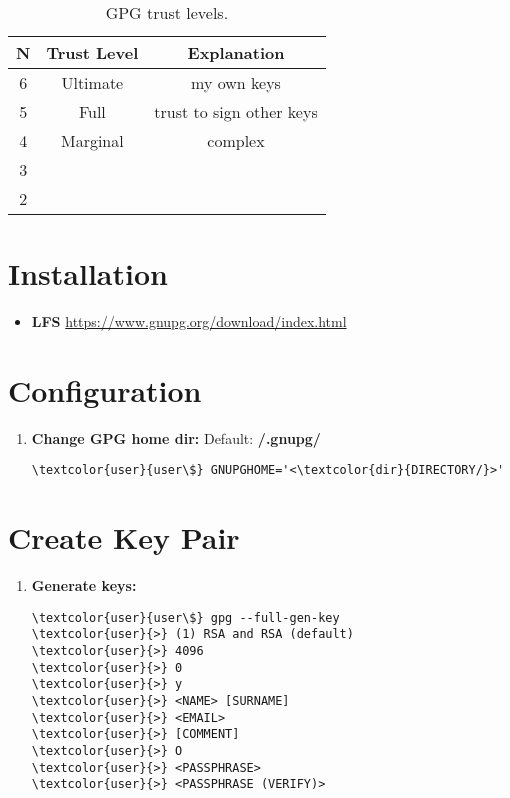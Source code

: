 \documentclass[10pt, a4paper, onecolumn, oneside, titlepage, openany]{book}
\begin{document}
\begin{table}[!ht]
\centering
\begin{tabular}{|c|c|c|}
    \hline
    \textbf{N} & \textbf{Trust Level} & \textbf{Explanation} \\
    \hline
    6 & Ultimate & my own keys\\
    5 & Full & trust to sign other keys\\
    4 & Marginal & complex\\
    3 & & \\
    2 & & \\
    \hline
\end{tabular}
\caption{GPG trust levels.}
\label{table:gpg_trust_levels}
\end{table}

\section{Installation}
\begin{itemize}
    \item \textbf{LFS}
\newline \url{https://www.gnupg.org/download/index.html}
\end{itemize}

\section{Configuration}
\begin{enumerate}
    \item \textbf{Change GPG home dir:}
\newline Default: \textbf{\textcolor{dir}{\texttildelow/.gnupg/}}
\begin{Verbatim}[commandchars=\\\{\}]
\textcolor{user}{user\$} GNUPGHOME='<\textcolor{dir}{DIRECTORY/}>'
\end{Verbatim}
\end{enumerate}

\section{Create Key Pair}
\begin{enumerate}
    \item \textbf{Generate keys:}
\begin{Verbatim}[commandchars=\\\{\}]
\textcolor{user}{user\$} gpg --full-gen-key
\textcolor{user}{>} (1) RSA and RSA (default)
\textcolor{user}{>} 4096
\textcolor{user}{>} 0
\textcolor{user}{>} y
\textcolor{user}{>} <NAME> [SURNAME]
\textcolor{user}{>} <EMAIL>
\textcolor{user}{>} [COMMENT]
\textcolor{user}{>} O
\textcolor{user}{>} <PASSPHRASE>
\textcolor{user}{>} <PASSPHRASE (VERIFY)>
\end{Verbatim}
\end{enumerate}
\end{document}
